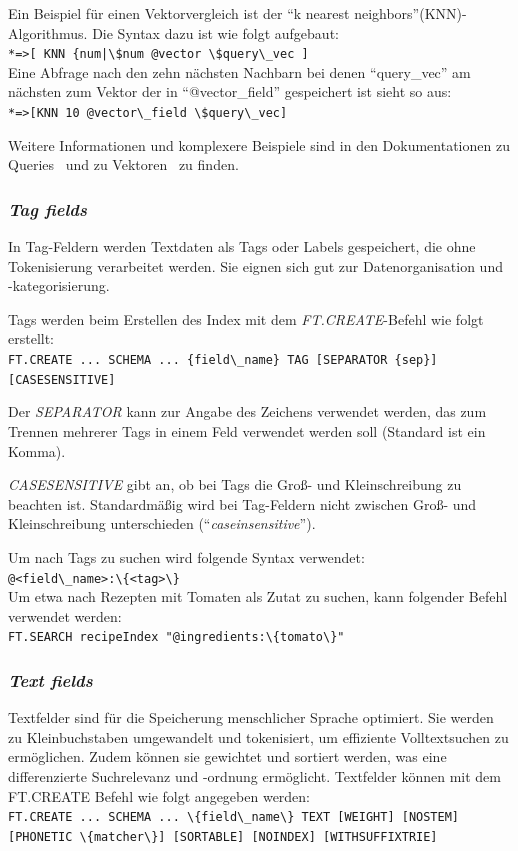 Ein Beispiel für einen Vektorvergleich ist der \enquote{k nearest neighbors}(KNN)-Algorithmus. Die Syntax dazu ist wie folgt aufgebaut:\\
\lstinline+*=>[ KNN {num|\$num @vector \$query\_vec ]+\\
Eine Abfrage nach den zehn nächsten Nachbarn bei denen \enquote{query\_vec} am nächsten zum Vektor der in \enquote{@vector\_field} gespeichert ist sieht so aus:\\
\lstinline+*=>[KNN 10 @vector\_field \$query\_vec]+

Weitere Informationen und komplexere Beispiele sind in den Dokumentationen zu Queries~\cite{redis_ltd_query_nodate} und zu Vektoren~\cite{redis_ltd_vectors_nodate} zu finden.


\subsubsection{\emph{Tag fields}} In Tag-Feldern werden Textdaten als Tags oder Labels gespeichert, die ohne Tokenisierung verarbeitet werden. Sie eignen sich gut zur Datenorganisation und -kategorisierung.

Tags werden beim Erstellen des Index mit dem \emph{FT.CREATE}-Befehl wie folgt erstellt:\\
\lstinline|FT.CREATE ... SCHEMA ... {field\_name} TAG [SEPARATOR {sep}] [CASESENSITIVE]|

Der \emph{SEPARATOR} kann zur Angabe des Zeichens verwendet werden, das zum Trennen mehrerer Tags in einem Feld verwendet werden soll (Standard ist ein Komma).

\emph{CASESENSITIVE} gibt an, ob bei Tags die Groß- und Kleinschreibung zu beachten ist. Standardmäßig wird bei Tag-Feldern nicht zwischen Groß- und Kleinschreibung unterschieden (\enquote{\emph{caseinsensitive}}).

Um nach Tags zu suchen wird folgende Syntax verwendet:\\
\lstinline|@<field\_name>:\{<tag>\}|\\
Um etwa nach Rezepten mit Tomaten als Zutat zu suchen, kann folgender Befehl verwendet werden:\\
\lstinline|FT.SEARCH recipeIndex "@ingredients:\{tomato\}"|


\subsubsection{{\emph{Text fields}}}
Textfelder sind für die Speicherung menschlicher Sprache optimiert. Sie werden zu Kleinbuchstaben umgewandelt und tokenisiert, um effiziente Volltextsuchen zu ermöglichen. Zudem können sie gewichtet und sortiert werden, was eine differenzierte Suchrelevanz und -ordnung ermöglicht.
Textfelder können mit dem FT.CREATE Befehl wie folgt angegeben werden:\\
\lstinline|FT.CREATE ... SCHEMA ... \{field\_name\} TEXT [WEIGHT] [NOSTEM] [PHONETIC \{matcher\}] [SORTABLE] [NOINDEX] [WITHSUFFIXTRIE]|

